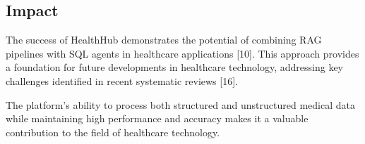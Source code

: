 \subsection{Impact}
The success of HealthHub demonstrates the potential of combining RAG pipelines with SQL agents in healthcare applications [10]. This approach provides a foundation for future developments in healthcare technology, addressing key challenges identified in recent systematic reviews [16].

The platform's ability to process both structured and unstructured medical data while maintaining high performance and accuracy makes it a valuable contribution to the field of healthcare technology. 